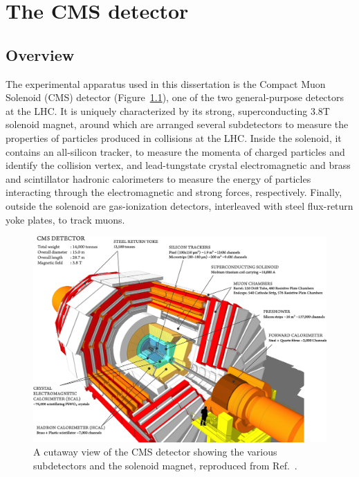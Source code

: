 \chapter{The CMS detector}
\label{sec:02_cms}

\section{Overview}

The experimental apparatus used in this dissertation is the Compact Muon Solenoid (CMS) detector (Figure~\ref{fig:02_cms_detector}), one of the two general-purpose detectors at the LHC.
It is uniquely characterized by its strong, superconducting 3.8\unit{T} solenoid magnet, around which are arranged several subdetectors to measure the properties of particles produced in collisions at the LHC.
Inside the solenoid, it contains an all-silicon tracker, to measure the momenta of charged particles and identify the collision vertex, and lead-tungstate crystal electromagnetic and brass and scintillator hadronic calorimeters to measure the energy of particles interacting through the electromagnetic and strong forces, respectively.
Finally, outside the solenoid are gas-ionization detectors, interleaved with steel flux-return yoke plates, to track muons. 

\begin{figure}[ht]
    \centering
    \includegraphics[width=\textwidth]{figures/02-CMS/cms/cms_schematic.png}
    \caption{A cutaway view of the CMS detector showing the various subdetectors and the solenoid magnet, reproduced from Ref.~\cite{CMS:2023gfb}.}
    \label{fig:02_cms_detector}
\end{figure}


